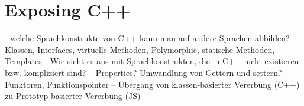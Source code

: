\chapter{Exposing C++}

 - welche Sprachkonstrukte von C++ kann man auf andere Sprachen abbilden? 
 -- Klassen, Interfaces, virtuelle Methoden, Polymorphie, statische Methoden, Templates
 - Wie sieht es aus mit Sprachkonstrukten, die in C++ nicht existieren bzw. kompliziert sind?
 -- Properties? Umwandlung von Gettern und settern? Funktoren, Funktionspointer
 -- Übergang von klassen-basierter Vererbung (C++) zu Prototyp-basierter Vererbung (JS)